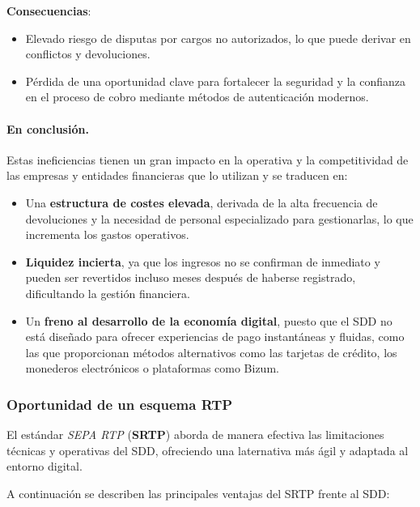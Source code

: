 \begin{enumerate}[label=\textbf{\arabic*.}, leftmargin=0.75cm]
        \textbf{Consecuencias}:
        \begin{itemize}
          \item Elevado riesgo de disputas por cargos no autorizados, lo que puede derivar en conflictos y devoluciones.
          \item Pérdida de una oportunidad clave para fortalecer la seguridad y la confianza en el proceso de cobro mediante métodos de autenticación modernos.
        \end{itemize}
\end{enumerate}

\paragraph{En conclusión.} Estas ineficiencias tienen un gran impacto en la operativa y la competitividad de las empresas y entidades financieras que lo utilizan y se traducen en:

\begin{itemize}[leftmargin=0.45cm]
  \item Una \textbf{estructura de costes elevada}, derivada de la alta frecuencia de devoluciones y la necesidad de personal especializado para gestionarlas, lo que incrementa los gastos operativos.
  \item \textbf{Liquidez incierta}, ya que los ingresos no se confirman de inmediato y pueden ser revertidos incluso meses después de haberse registrado, dificultando la gestión financiera.
  \item Un \textbf{freno al desarrollo de la economía digital}, puesto que el SDD no está diseñado para ofrecer experiencias de pago instantáneas y fluidas, como las que proporcionan métodos alternativos como las tarjetas de crédito, los monederos electrónicos o plataformas como Bizum.
\end{itemize}

\subsubsection{Oportunidad de un esquema RTP}
\label{subsec:oportunidadRTP}
El estándar \textit{SEPA RTP} (\textbf{SRTP}) aborda de manera efectiva las limitaciones técnicas y operativas del SDD, ofreciendo una laternativa más ágil y adaptada al entorno digital.

A continuación se describen las principales ventajas del SRTP frente al SDD:

